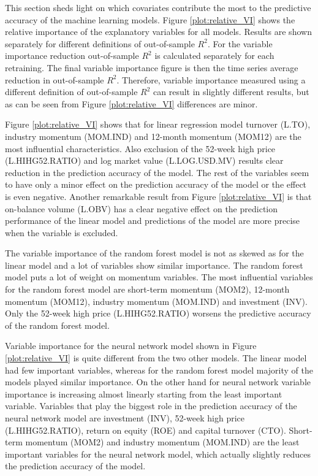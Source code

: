\documentclass[12pt]{article}
\begin{document}
This section sheds light on which covariates contribute the most to the predictive accuracy of the machine learning models. Figure \ref{plot:relative_VI} shows the relative importance of the explanatory variables for all models. Results are shown separately for different definitions of out-of-sample $R^2$. For the variable importance reduction out-of-sample $R^2$ is calculated separately for each retraining. The final variable importance figure is then the time series average reduction in out-of-sample $R^2$. Therefore, variable importance measured using a different definition of out-of-sample $R^2$ can result in slightly different results, but as can be seen from Figure \ref{plot:relative_VI} differences are minor. \par

Figure \ref{plot:relative_VI} shows that for linear regression model turnover (L.TO), industry momentum (MOM.IND) and 12-month momentum (MOM12) are the most influential characteristics. Also exclusion of the 52-week high price (L.HIHG52.RATIO) and log market value (L.LOG.USD.MV) results clear reduction in the prediction accuracy of the model. The rest of the variables seem to have only a minor effect on the prediction accuracy of the model or the effect is even negative. Another remarkable result from Figure \ref{plot:relative_VI} is that on-balance volume (L.OBV) has a clear negative effect on the prediction performance of the linear model and predictions of the model are more precise when the variable is excluded. \par

The variable importance of the random forest model is not as skewed as for the linear model and a lot of variables show similar importance. The random forest model puts a lot of weight on momentum variables. The most influential variables for the random forest model are short-term momentum (MOM2), 12-month momentum (MOM12), industry momentum (MOM.IND) and investment (INV). Only the 52-week high price (L.HIHG52.RATIO) worsens the predictive accuracy of the random forest model. \par

Variable importance for the neural network model shown in Figure \ref{plot:relative_VI} is quite different from the two other models. The linear model had few important variables, whereas for the random forest model majority of the models played similar importance. On the other hand for neural network variable importance is increasing almost linearly starting from the least important variable. Variables that play the biggest role in the prediction accuracy of the neural network model are investment (INV), 52-week high price (L.HIHG52.RATIO), return on equity (ROE) and capital turnover (CTO). Short-term momentum (MOM2) and industry momentum (MOM.IND) are the least important variables for the neural network model, which actually slightly reduces the prediction accuracy of the model. \par 
\end{document}
